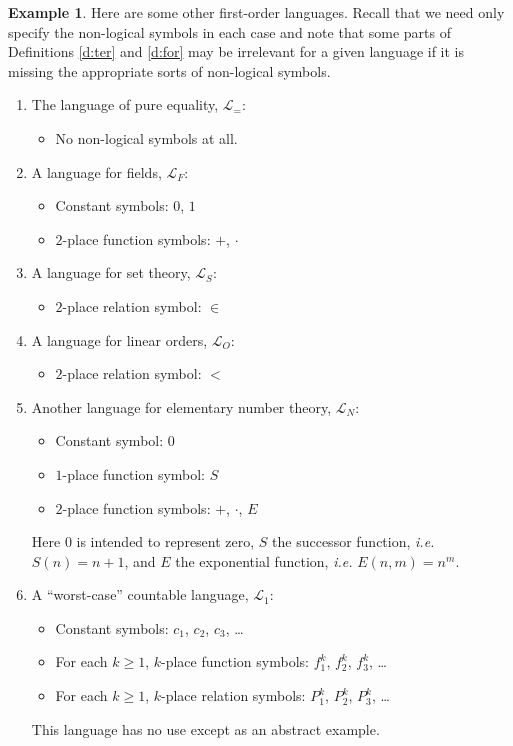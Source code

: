 \documentclass[12pt]{amsbook}
\theoremstyle{plain}
\theoremstyle{definition}
\newtheorem{exmp}{Example}[chapter]
\theoremstyle{remark}
\begin{document}
\begin{exmp} \label{e:lan}
Here are some other first-order languages.   Recall that we need only specify the non-logical symbols in each case and note that some parts of Definitions \ref{d:ter} and \ref{d:for} may be irrelevant for a given language if it is missing the appropriate sorts of non-logical symbols.
\begin{enumerate}
  \item  The language of pure equality,  $\mathcal{L}_=$:
    \begin{itemize}
      \item No non-logical symbols at all.
    \end{itemize}
  \item A language for fields,  $\mathcal{L}_F$:
    \begin{itemize}
      \item Constant symbols:  $0$,  $1$
      \item $2$-place function symbols:  $+$,  $\cdot$
    \end{itemize}
  \item A language for set theory,  $\mathcal{L}_S$:
    \begin{itemize}
      \item $2$-place relation symbol:  $\in$
    \end{itemize}
  \item A language for linear orders,  $\mathcal{L}_O$:
    \begin{itemize}
      \item $2$-place relation symbol:  $<$
    \end{itemize}
  \item Another language for elementary number theory,  $\mathcal{L}_N$:
    \begin{itemize}
      \item Constant symbol:  $0$
      \item $1$-place function symbol:  $S$
      \item $2$-place function symbols:  $+$, $\cdot$, $E$
    \end{itemize}
    Here $0$ is intended to represent zero,  $S$ the successor function,  {\em i.e.\/}  $S(n) = n + 1$,  and $E$ the exponential function,  {\em i.e.\/}  $E(n,m) = n^m$.
  \item A ``worst-case'' countable language,  $\mathcal{L}_1$:
    \begin{itemize}
      \item Constant symbols:  $c_1$,  $c_2$,  $c_3$,  \dots
      \item For each $k \ge 1$,  $k$-place function symbols:  $f^k_1$,  $f^k_2$,  $f^k_3$,  \dots
      \item For each $k \ge 1$,  $k$-place relation symbols:  $P^k_1$,  $P^k_2$,  $P^k_3$,  \dots
    \end{itemize}
    This language has no use except as an abstract example.
\end{enumerate}
\end{exmp}
\end{document}
